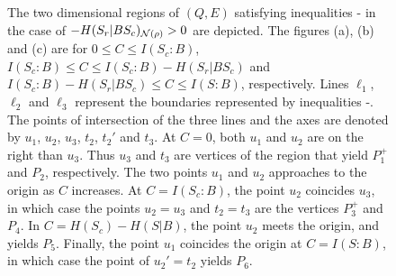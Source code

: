 \documentclass[journal]{IEEEtran}
\begin{document}
\begin{lmm}
\begin{lmm}
\begin{figure}[t]
{
}
\caption{
The two dimensional regions of $(Q,E)$ satisfying inequalities - in the case of $-H(S_r|BS_c)_{{\mathcal N}(\rho)}>0$ are depicted.
The figures (a), (b) and (c) are for $0\leq C\leq I(S_c:B)$, $I(S_c:B)\leq C\leq I(S_c:B)-H(S_r|BS_c)$ and $I(S_c:B)-H(S_r|BS_c)\leq C\leq I(S:B)$, respectively.
Lines $\ell_1$, $\ell_2$ and $\ell_3$ represent the boundaries represented by inequalities -. 
The points of intersection of the three lines and the axes are denoted by $u_1$, $u_2$, $u_3$, $t_2$, $t_2'$ and $t_3$. 
At $C=0$, both $u_1$ and $u_2$ are on the right than $u_3$.
Thus $u_3$ and $t_3$ are vertices of the region that yield $P_1^+$ and $P_2$, respectively.
The two points $u_1$ and $u_2$ approaches to the origin as $C$ increases.
At $C=I(S_c:B)$, the point $u_2$ coincides $u_3$, in which case the points $u_2=u_3$ and $t_2=t_3$ are the vertices $P_3^+$ and $P_4$.
In $C=H(S_c)-H(S|B)$, the point $u_2$ meets the origin, and yields $P_5$.
Finally, the point $u_1$ coincides the origin at $C=I(S:B)$,  in which case the point of $u_2'=t_2$ yields $P_6$.
}
\label{fig:rateregion1}
\end{figure}



\end{lmm}
\end{lmm}
\end{document}
